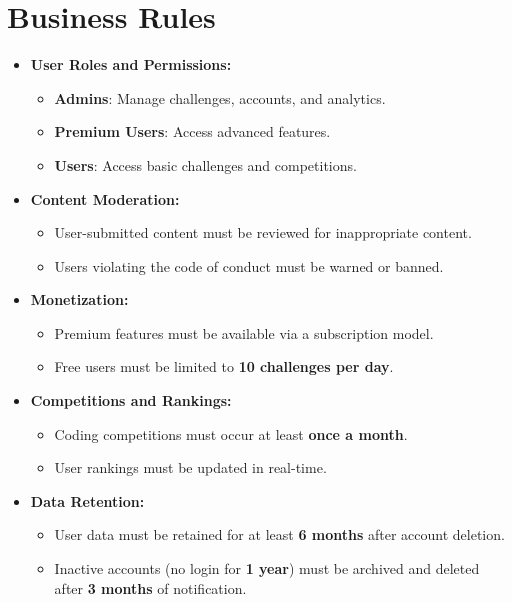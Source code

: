 \documentclass[a4paper, 11pt]{scrreprt}
\begin{document}
\section{Business Rules}
\begin{itemize}
    \item \textbf{User Roles and Permissions:}
    \begin{itemize}
        \item \textbf{Admins}: Manage challenges, accounts, and analytics.
        \item \textbf{Premium Users}: Access advanced features.
        \item \textbf{Users}: Access basic challenges and competitions.
    \end{itemize}

    \item \textbf{Content Moderation:}
    \begin{itemize}
        \item User-submitted content must be reviewed for inappropriate content.
        \item Users violating the code of conduct must be warned or banned.
    \end{itemize}

    \item \textbf{Monetization:}
    \begin{itemize}
        \item Premium features must be available via a subscription model.
        \item Free users must be limited to \textbf{10 challenges per day}.
    \end{itemize}

    \item \textbf{Competitions and Rankings:}
    \begin{itemize}
        \item Coding competitions must occur at least \textbf{once a month}.
        \item User rankings must be updated in real-time.
    \end{itemize}

    \item \textbf{Data Retention:}
    \begin{itemize}
        \item User data must be retained for at least \textbf{6 months} after account deletion.
        \item Inactive accounts (no login for \textbf{1 year}) must be archived and deleted after \textbf{3 months} of notification.
    \end{itemize}
\end{itemize}
\end{document}
